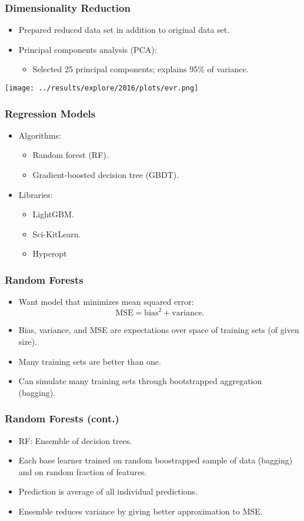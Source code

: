 \documentclass{beamer}
\begin{document}
\begin{frame}
\frametitle{Dimensionality Reduction}
\begin{itemize}
\item Prepared reduced data set in addition to original data set.
\item Principal components analysis (PCA):
\begin{itemize}
\item Selected 25 principal components; explains 95\% of variance.
\end{itemize}
\end{itemize}
\begin{center}
\texttt{[image: ../results/explore/2016/plots/evr.png]}
\end{center}
\end{frame}

\begin{frame}
\frametitle{Regression Models}
\begin{itemize}
\item Algorithms:
\begin{itemize}
\item Random forest (RF).
\item Gradient-boosted decision tree (GBDT).
\end{itemize}
\item Libraries:
\begin{itemize}
\item LightGBM.
\item Sci-KitLearn.
\item Hyperopt
\end{itemize}
\end{itemize}
\end{frame}

\begin{frame}
\frametitle{Random Forests}
\begin{itemize}
\item Want model that minimizes mean squared error:
\[ \mbox{MSE} = \mbox{bias}^2 + \mbox{variance}. \]
\item Bias, variance, and MSE are expectations over space of training sets (of given size).
\item Many training sets are better than one.
\item Can simulate many training sets through bootstrapped aggregation (bagging).
\end{itemize}
\end{frame}

\begin{frame}
\frametitle{Random Forests (cont.)}
\begin{itemize}
\item RF: Ensemble of decision trees.
\item Each base learner trained on random boostrapped sample of data (bagging) and on random fraction of features.
\item Prediction is average of all individual predictions.
\item Ensemble reduces variance by giving better approximation to MSE.
\end{itemize}
\end{frame}
\end{document}
